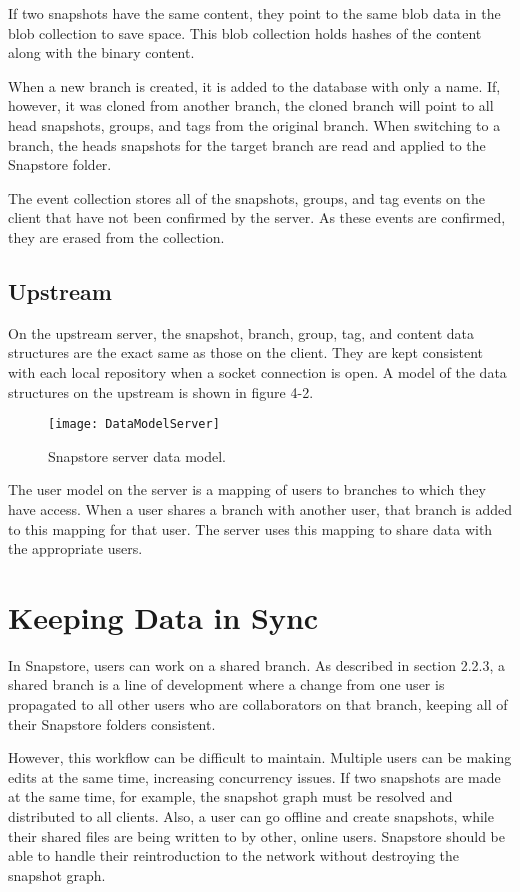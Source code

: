 If two snapshots have the same content, they point to the same blob data in the blob collection to save space. This blob collection holds hashes of the content along with the binary content.

When a new branch is created, it is added to the database with only a name. If, however, it was cloned from another branch, the cloned branch will point to all head snapshots, groups, and tags from the original branch. When switching to a branch, the heads snapshots for the target branch are read and applied to the Snapstore folder.

The event collection stores all of the snapshots, groups, and tag events on the client that have not been confirmed by the server. As these events are confirmed, they are erased from the collection.

\subsection{Upstream}

On the upstream server, the snapshot, branch, group, tag, and content data structures are the exact same as those on the client. They are kept consistent with each local repository when a socket connection is open. A model of the data structures on the upstream is shown in figure 4-2.

\begin{figure}
\texttt{[image: DataModelServer]}
\caption{Snapstore server data model.}
\label{arm:fig1}
\end{figure}

The user model on the server is a mapping of users to branches to which they have access. When a user shares a branch with another user, that branch is added to this mapping for that user. The server uses this mapping to share data with the appropriate users.

\section{Keeping Data in Sync}

In Snapstore, users can work on a shared branch. As described in section 2.2.3, a shared branch is a line of development where a change from one user is propagated to all other users who are collaborators on that branch, keeping all of their Snapstore folders consistent.

However, this workflow can be difficult to maintain. Multiple users can be making edits at the same time, increasing concurrency issues. If two snapshots are made at the same time, for example, the snapshot graph must be resolved and distributed to all clients. Also, a user can go offline and create snapshots, while their shared files are being written to by other, online users. Snapstore should be able to handle their reintroduction to the network without destroying the snapshot graph.


